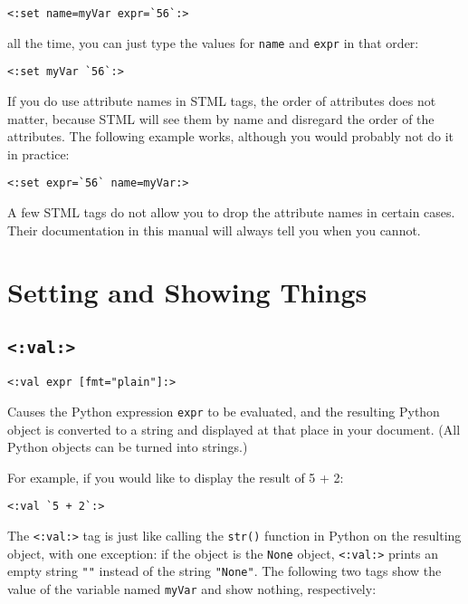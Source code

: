 \documentclass{manual}
\begin{document}
\begin{verbatim}
<:set name=myVar expr=`56`:>
\end{verbatim}


all the time, you can just type the values for \texttt{name}
and \texttt{expr} in that order:

\begin{verbatim}
<:set myVar `56`:>
\end{verbatim}

If you do use attribute names in STML tags, the order of attributes
does not matter, because STML will see them by name and disregard
the order of the attributes. The following example works, although
you would probably not do it in practice:

\begin{verbatim}
<:set expr=`56` name=myVar:>
\end{verbatim}

A few STML tags do not allow you to drop the attribute names
in certain cases. Their documentation in this manual will always tell
you when you cannot.




\chapter{Setting and Showing Things}
\label{stmlrefstandard}

\section{\texttt{<:val:>}}
\label{tagval}

\begin{verbatim}
<:val expr [fmt="plain"]:>
\end{verbatim}

Causes the Python expression \texttt{expr} to be evaluated, 
and the resulting Python object is converted to a string and 
displayed at that place in your document. 
(All Python objects can be turned into strings.) 

For example, if you would like to display the result of 5 + 2:

\begin{verbatim}
<:val `5 + 2`:>
\end{verbatim}


The \texttt{<:val:>} tag is just like calling the \texttt{str()} 
function in Python on the resulting object, with one exception: 
if the object is the \texttt{None} object, \texttt{<:val:>} 
prints an empty string \texttt{""} instead of the string 
\texttt{"None"}. The following two tags show the value of
the variable named \texttt{myVar} and show nothing, respectively:
\end{document}
